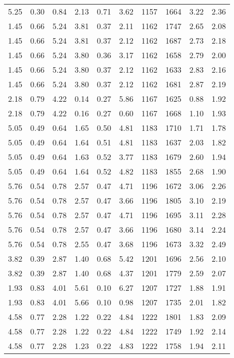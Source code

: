 \begin{longtable}{rrrrrrrrrr}
5.25	&	0.30	&	0.84	&	2.13	&	0.71	&	3.62	&	1157	&	1664	&	3.22	&	2.36	\\
1.45	&	0.66	&	5.24	&	3.81	&	0.37	&	2.11	&	1162	&	1747	&	2.65	&	2.08	\\
1.45	&	0.66	&	5.24	&	3.81	&	0.37	&	2.12	&	1162	&	1687	&	2.73	&	2.18	\\
1.45	&	0.66	&	5.24	&	3.80	&	0.36	&	3.17	&	1162	&	1658	&	2.79	&	2.00	\\
1.45	&	0.66	&	5.24	&	3.80	&	0.37	&	2.12	&	1162	&	1633	&	2.83	&	2.16	\\
1.45	&	0.66	&	5.24	&	3.80	&	0.37	&	2.12	&	1162	&	1681	&	2.87	&	2.19	\\
2.18	&	0.79	&	4.22	&	0.14	&	0.27	&	5.86	&	1167	&	1625	&	0.88	&	1.92	\\
2.18	&	0.79	&	4.22	&	0.16	&	0.27	&	0.60	&	1167	&	1668	&	1.10	&	1.93	\\
5.05	&	0.49	&	0.64	&	1.65	&	0.50	&	4.81	&	1183	&	1710	&	1.71	&	1.78	\\
5.05	&	0.49	&	0.64	&	1.64	&	0.51	&	4.81	&	1183	&	1637	&	2.03	&	1.82	\\
5.05	&	0.49	&	0.64	&	1.63	&	0.52	&	3.77	&	1183	&	1679	&	2.60	&	1.94	\\
5.05	&	0.49	&	0.64	&	1.64	&	0.52	&	4.82	&	1183	&	1855	&	2.68	&	1.90	\\
5.76	&	0.54	&	0.78	&	2.57	&	0.47	&	4.71	&	1196	&	1672	&	3.06	&	2.26	\\
5.76	&	0.54	&	0.78	&	2.57	&	0.47	&	3.66	&	1196	&	1805	&	3.10	&	2.19	\\
5.76	&	0.54	&	0.78	&	2.57	&	0.47	&	4.71	&	1196	&	1695	&	3.11	&	2.28	\\
5.76	&	0.54	&	0.78	&	2.57	&	0.47	&	3.66	&	1196	&	1680	&	3.14	&	2.24	\\
5.76	&	0.54	&	0.78	&	2.55	&	0.47	&	3.68	&	1196	&	1673	&	3.32	&	2.49	\\
3.82	&	0.39	&	2.87	&	1.40	&	0.68	&	5.42	&	1201	&	1696	&	2.56	&	2.10	\\
3.82	&	0.39	&	2.87	&	1.40	&	0.68	&	4.37	&	1201	&	1779	&	2.59	&	2.07	\\
1.93	&	0.83	&	4.01	&	5.61	&	0.10	&	6.27	&	1207	&	1727	&	1.88	&	1.91	\\
1.93	&	0.83	&	4.01	&	5.66	&	0.10	&	0.98	&	1207	&	1735	&	2.01	&	1.82	\\
4.58	&	0.77	&	2.28	&	1.22	&	0.22	&	4.84	&	1222	&	1801	&	1.83	&	2.09	\\
4.58	&	0.77	&	2.28	&	1.22	&	0.22	&	4.84	&	1222	&	1749	&	1.92	&	2.14	\\
4.58	&	0.77	&	2.28	&	1.23	&	0.22	&	4.83	&	1222	&	1758	&	1.94	&	2.11	\\

\end{longtable}

